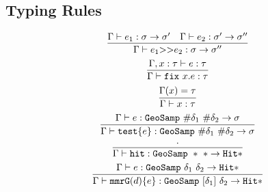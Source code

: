 \documentclass{article}
\newcommand {\chain}{\mathtt{>>}}
\newcommand {\fix}{\mathtt{fix}}
\newcommand {\test}{\mathtt{test}}
\newcommand {\isect}{\mathtt{hit}}
\newcommand {\mmrG}{\mathtt{mmrG}}
\newcommand {\geosamp}{\mathtt{GeoSamp}}
\newcommand {\hit}{\mathtt{Hit}}
\newcommand {\inferenceSpacing}{\setlength{\jot}{3ex}}
\begin{document}
\subsection{Typing Rules}
\inferenceSpacing
\begin{gather}
\infer {\Gamma\vdash e_1 \chain e_2 : \sigma \to \sigma''}{\Gamma \vdash e_1 : \sigma\to \sigma' & \Gamma \vdash e_2 : \sigma' \to \sigma''} \\
\infer {\Gamma\vdash \fix~x.e : \tau}{\Gamma, x:\tau \vdash e : \tau} \\
\infer {\Gamma\vdash x : \tau}{\Gamma(x) = \tau} \\
\infer {\Gamma\vdash \test \{ e \} : \geosamp~\#\delta_1~\#\delta_2 \to \sigma}{\Gamma \vdash e : \geosamp~\#\delta_1~\#\delta_2  \to \sigma} \\
\infer {\Gamma \vdash \isect : \geosamp~\ast~\ast \to \hit \ast} {\cdot} \\
\infer {\Gamma \vdash \mmrG (d) \{ e \} : \geosamp~[\delta_1]~\delta_2 \to \hit \ast} {\Gamma \vdash e : \geosamp~\delta_1~\delta_2 \to \hit \ast }
\end{gather}
\end{document}
